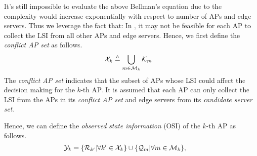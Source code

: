 It's still impossible to evaluate the above Bellman's equation due to the complexity would increase exponentially with respect to number of APs and edge servers.
Thus we leverage the fact that:
In , it may not be feasible for each AP to collect the LSI from all other APs and edge servers.
Hence, we first define the \emph{conflict AP set} as follows.
\begin{align}
    \mathcal{X}_{k} \triangleq \bigcup_{m\in\mathcal{M}_{k}} \mathcal{K}_{m}
\end{align}
The \emph{conflict AP set} indicates that the subset of APs whose LSI could affect the decision making for the $k$-th AP.
It is assumed that each AP can only collect the LSI from the APs in its \emph{conflict AP set} and edge servers from its \emph{candidate server set}.
\begin{definition}
    Hence, we can define the \emph{observed state information} (OSI) of the $k$-th AP as follows.
    \begin{align}
        \mathcal{Y}_{k} &= \{\mathcal{R}_{k'} | \forall k'\in\mathcal{X}_{k}\}
                        \cup \{\mathcal{Q}_{m} | \forall m\in\mathcal{M}_{k}\},
    \end{align}
\end{definition}

